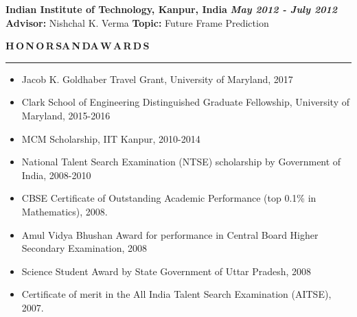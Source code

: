 \documentclass[11pt, a4paper]{article}
\begin{document}
\vspace{4pt}

\textbf{Indian Institute of Technology, Kanpur, India} \hfill \textit{\textbf{May 2012 - July 2012}} \\
\textbf{Advisor: }Nishchal K. Verma \hfill \textbf{Topic: }Future Frame Prediction
	
%

\vspace{15pt}

\textbf{H\,O\,N\,O\,R\,S{\hspace{0.6em}}A\,N\,D{\hspace{0.6em}}A\,W\,A\,R\,D\,S}
\vspace{5pt}
\hrule
\vspace{-3pt}
\begin{itemize}[leftmargin=*] \itemsep1pt \parskip0pt 
\item Jacob K. Goldhaber Travel Grant, University of Maryland, 2017
\item Clark School of Engineering Distinguished Graduate Fellowship, University of Maryland, 2015-2016
\item MCM Scholarship, IIT Kanpur, 2010-2014
\item National Talent Search Examination (NTSE) scholarship by Government of India, 2008-2010
\item CBSE Certificate of Outstanding Academic Performance (top 0.1\% in Mathematics), 2008.
\item Amul Vidya Bhushan Award for performance in Central Board Higher Secondary Examination, 2008
\item Science Student Award by State Government of Uttar Pradesh, 2008
\item Certificate of merit in the All India Talent Search Examination (AITSE), 2007.
\end{itemize}

%
\end{document}

